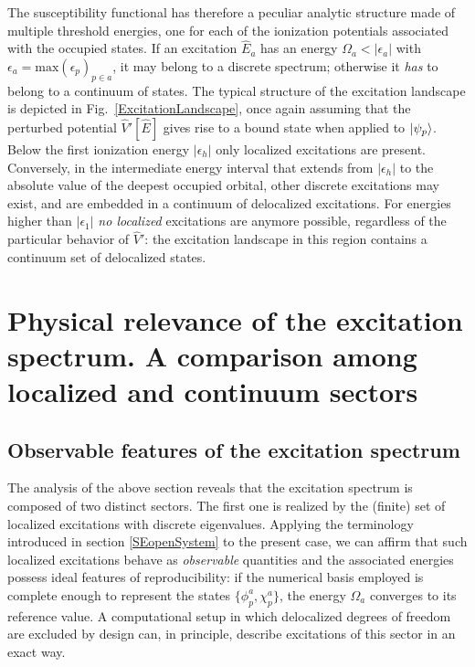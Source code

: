 \documentclass[reprint,aps,prb]{revtex4-1}
\newcommand{\eps}{\epsilon}
\newcommand{\op}[1]{\hat {#1}}
\begin{document}
The susceptibility functional has therefore a peculiar analytic structure made of multiple threshold energies, one for each of the ionization potentials associated with the occupied states. If an excitation $\op E_a$ has an energy $\Omega_a < |\eps_a|$ with $\eps_a = \mathrm{max}\left(\eps_p\right)_{p\in a}$, it may belong to a discrete spectrum; otherwise it \emph{has} to belong to a continuum of states.
The typical structure of the excitation landscape is depicted in Fig.~\ref{ExcitationLandscape}, once again assuming that the perturbed potential $\op V'[\op E]$ gives rise to a bound state when applied to $\ket{\psi_p}$. Below the first ionization energy $|\eps_h|$ only localized excitations are present. Conversely, in the intermediate energy interval that extends from $|\eps_h|$ to the absolute value of the deepest occupied orbital, other discrete excitations may exist, and are embedded in a continuum of delocalized excitations. For energies higher than $|\eps_1|$ \emph{no localized} excitations are anymore possible,
regardless of the particular behavior of $\op V'$: the excitation landscape in this region contains a continuum set of delocalized states.

\section{Physical relevance of the excitation spectrum. A comparison among localized and continuum sectors}

\subsection{Observable features of the excitation spectrum}

The analysis of the above section reveals that the excitation spectrum is composed of two distinct sectors.
The first one is realized by the (finite) set of localized excitations with discrete eigenvalues.
Applying the terminology introduced in section \ref{SEopenSystem} to the present case, we can affirm that such localized excitations behave as
\emph{observable} quantities and the associated energies possess ideal features of reproducibility:
if the numerical basis employed is complete enough to
represent the states $\{\phi_p^a,\chi_p^a\}$, the energy $\Omega_a$
converges to its reference value.
A computational setup in which delocalized degrees of freedom are excluded by design can, in principle, describe excitations of this sector in an exact way.
\end{document}

